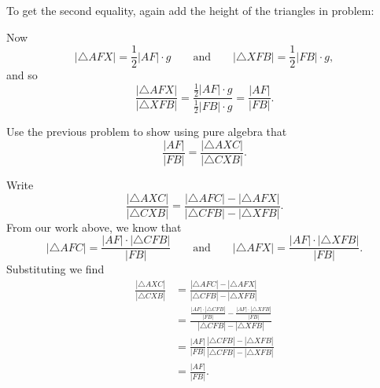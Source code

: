 \documentclass[newpage,hints,handout]{ximera}
\begin{document}
\begin{problem}
\begin{freeResponse}
To get the second equality, again add the height of the triangles in problem:
\begin{image}
\end{image}
Now 
\[
|\triangle AFX| = \frac{1}{2} |AF|\cdot g\qquad\text{and}\qquad |\triangle XFB| = \frac{1}{2} |FB|\cdot g,
\]
and so
\[
\frac{|\triangle AFX|}{|\triangle XFB|} = \frac{\frac{1}{2} |AF|\cdot g}{\frac{1}{2} |FB|\cdot g} = \frac{|AF|}{|FB|}.
\]
\end{freeResponse}
\end{problem}

\begin{problem}
\label{26} Use the previous problem to show using pure algebra that%
\[
\frac{|AF|}{|FB|}=\frac{|\triangle AXC|}{|\triangle CXB|}. %
\]
\begin{freeResponse}
Write
\[
\frac{|\triangle AXC|}{|\triangle CXB|} = \frac{|\triangle AFC|-|\triangle AFX|}{|\triangle CFB|-|\triangle XFB|}.
\]
From our work above, we know that
\[
|\triangle AFC| = \frac{|AF|\cdot |\triangle CFB|}{|FB|} \qquad\text{and}\qquad |\triangle AFX| = \frac{|AF|\cdot |\triangle XFB|}{|FB|}.
\]
Substituting we find
\begin{align*}
\frac{|\triangle AXC|}{|\triangle CXB|} &= \frac{|\triangle AFC|-|\triangle AFX|}{|\triangle CFB|-|\triangle XFB|}\\
&=\frac{ \frac{|AF|\cdot |\triangle CFB|}{|FB|}- \frac{|AF|\cdot |\triangle XFB|}{|FB|}}{|\triangle CFB|-|\triangle XFB|}\\
&=\frac{|AF|}{|FB|} \frac{|\triangle CFB|- |\triangle XFB|}{|\triangle CFB|-|\triangle XFB|}\\
&=\frac{|AF|}{|FB|}.
\end{align*}
\end{freeResponse}
\end{problem}
\end{document}

